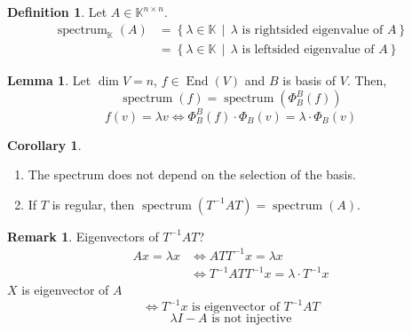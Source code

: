 \documentclass[a4paper,landscape,twocolumn]{article}
\newcommand\setdef[2]{\left\{#1\,\middle|\,#2\right\}}
\theoremstyle{definition}
\newtheorem{defi}{Definition}
\newtheorem{rem}{Remark}
\newtheorem{lemma}{Lemma}
\newtheorem{cor}{Corollary}
\DeclareMathOperator\End{End} %
\DeclareMathOperator\spec{spectrum}
\begin{document}
\begin{defi}
  \label{defi-10.7}
  Let $A \in \mathbb K^{n\times n}$.
  \begin{align*}
    \spec_{\mathbb K}(A) &= \setdef{\lambda \in \mathbb K}{\lambda \text{ is rightsided eigenvalue of } A} \\
      &= \setdef{\lambda \in \mathbb K}{\lambda \text{ is leftsided eigenvalue of } A}
  \end{align*}
\end{defi}

\begin{lemma}
  \label{lemma-10.8}
  Let $\dim{V} = n$, $f \in \End(V)$ and $B$ is basis of $V$. Then,
  \[ \spec(f) = \spec(\Phi_B^B(f)) \]
  \[ f(v) = \lambda v \Leftrightarrow \Phi_B^B(f) \cdot \Phi_B(v) = \lambda \cdot \Phi_B(v) \]
\end{lemma}

\begin{cor}
  \label{cor-10.9}
  \begin{enumerate}
    \item The spectrum does not depend on the selection of the basis.
    \item If $T$ is regular, then $\spec(T^{-1} AT) = \spec(A)$.
  \end{enumerate}
\end{cor}

\begin{rem}
  Eigenvectors of $T^{-1} AT$?
  \begin{align*}
    Ax = \lambda x &\Leftrightarrow AT T^{-1} x = \lambda x \\
                   &\Leftrightarrow T^{-1} AT T^{-1} x = \lambda \cdot T^{-1} x
  \end{align*}
  $X$ is eigenvector of $A$
  \[ \Leftrightarrow T^{-1} x \text{ is eigenvector of } T^{-1} A T \]
  \[ \lambda I - A \text{ is not injective} \]
\end{rem}
\end{document}
